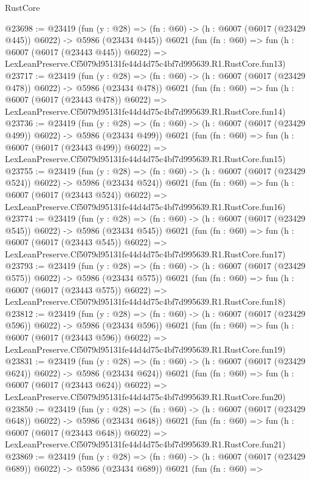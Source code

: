 \begin{lexlean}{RustCore}
\begin{coremodule}
@23698 := @23419
    (fun (y : @28) => (fn : @60) -> (h : @6007 (@6017 (@23429 @445)) @6022) -> @5986 (@23434 @445))
    @6021
    (fun (fn : @60) =>
    fun (h : @6007 (@6017 (@23443 @445)) @6022) =>
    LexLeanPreserve.Cf5079d95131fe44d4d75c4bf7d995639.R1.RustCore.fun13)
@23717 := @23419
    (fun (y : @28) => (fn : @60) -> (h : @6007 (@6017 (@23429 @478)) @6022) -> @5986 (@23434 @478))
    @6021
    (fun (fn : @60) =>
    fun (h : @6007 (@6017 (@23443 @478)) @6022) =>
    LexLeanPreserve.Cf5079d95131fe44d4d75c4bf7d995639.R1.RustCore.fun14)
@23736 := @23419
    (fun (y : @28) => (fn : @60) -> (h : @6007 (@6017 (@23429 @499)) @6022) -> @5986 (@23434 @499))
    @6021
    (fun (fn : @60) =>
    fun (h : @6007 (@6017 (@23443 @499)) @6022) =>
    LexLeanPreserve.Cf5079d95131fe44d4d75c4bf7d995639.R1.RustCore.fun15)
@23755 := @23419
    (fun (y : @28) => (fn : @60) -> (h : @6007 (@6017 (@23429 @524)) @6022) -> @5986 (@23434 @524))
    @6021
    (fun (fn : @60) =>
    fun (h : @6007 (@6017 (@23443 @524)) @6022) =>
    LexLeanPreserve.Cf5079d95131fe44d4d75c4bf7d995639.R1.RustCore.fun16)
@23774 := @23419
    (fun (y : @28) => (fn : @60) -> (h : @6007 (@6017 (@23429 @545)) @6022) -> @5986 (@23434 @545))
    @6021
    (fun (fn : @60) =>
    fun (h : @6007 (@6017 (@23443 @545)) @6022) =>
    LexLeanPreserve.Cf5079d95131fe44d4d75c4bf7d995639.R1.RustCore.fun17)
@23793 := @23419
    (fun (y : @28) => (fn : @60) -> (h : @6007 (@6017 (@23429 @575)) @6022) -> @5986 (@23434 @575))
    @6021
    (fun (fn : @60) =>
    fun (h : @6007 (@6017 (@23443 @575)) @6022) =>
    LexLeanPreserve.Cf5079d95131fe44d4d75c4bf7d995639.R1.RustCore.fun18)
@23812 := @23419
    (fun (y : @28) => (fn : @60) -> (h : @6007 (@6017 (@23429 @596)) @6022) -> @5986 (@23434 @596))
    @6021
    (fun (fn : @60) =>
    fun (h : @6007 (@6017 (@23443 @596)) @6022) =>
    LexLeanPreserve.Cf5079d95131fe44d4d75c4bf7d995639.R1.RustCore.fun19)
@23831 := @23419
    (fun (y : @28) => (fn : @60) -> (h : @6007 (@6017 (@23429 @624)) @6022) -> @5986 (@23434 @624))
    @6021
    (fun (fn : @60) =>
    fun (h : @6007 (@6017 (@23443 @624)) @6022) =>
    LexLeanPreserve.Cf5079d95131fe44d4d75c4bf7d995639.R1.RustCore.fun20)
@23850 := @23419
    (fun (y : @28) => (fn : @60) -> (h : @6007 (@6017 (@23429 @648)) @6022) -> @5986 (@23434 @648))
    @6021
    (fun (fn : @60) =>
    fun (h : @6007 (@6017 (@23443 @648)) @6022) =>
    LexLeanPreserve.Cf5079d95131fe44d4d75c4bf7d995639.R1.RustCore.fun21)
@23869 := @23419
    (fun (y : @28) => (fn : @60) -> (h : @6007 (@6017 (@23429 @689)) @6022) -> @5986 (@23434 @689))
    @6021
    (fun (fn : @60) =>

\end{coremodule}
\end{lexlean}
